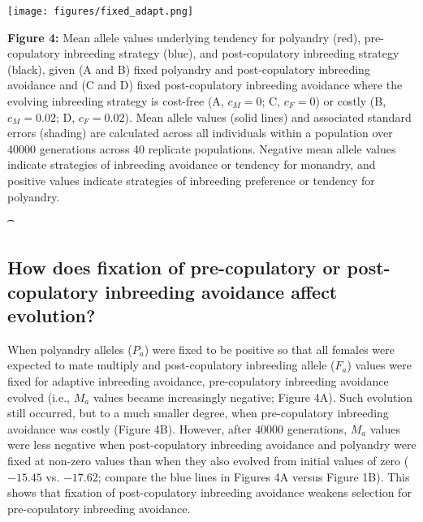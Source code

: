 \documentclass[10pt,letterpaper]{article}
\begin{document}
{\color{Gray}
\begin{adjustwidth}{-2.2in}{0in}
{%
   \texttt{[image: figures/fixed\_adapt.png]}%
}
{%
   \begin{justify}\vspace{0.25 mm} \textbf{Figure 4:} Mean allele values underlying tendency for polyandry (red), pre-copulatory inbreeding strategy (blue), and post-copulatory inbreeding strategy (black), given (A and B) fixed polyandry and post-copulatory inbreeding avoidance and (C and D) fixed post-copulatory inbreeding avoidance where the evolving inbreeding strategy is cost-free (A, $c_{M} = 0$; C, $c_{F} = 0$) or costly (B, $c_{M}=0.02$; D, $c_{F}=0.02$). Mean allele values (solid lines) and associated standard errors (shading) are calculated across all individuals within a population over 40000 generations across 40 replicate populations. Negative mean allele values indicate strategies of inbreeding avoidance or tendency for monandry, and positive values indicate strategies of inbreeding preference or tendency for polyandry. \end{justify}{\t}%
}
\end{adjustwidth}
}


\subsection*{How does fixation of pre-copulatory or post-copulatory inbreeding avoidance affect evolution?}

When polyandry alleles ($P_{a}$) were fixed to be positive so that all females were expected to mate multiply and post-copulatory inbreeding allele ($F_{a}$) values were fixed for adaptive inbreeding avoidance, pre-copulatory inbreeding avoidance evolved (i.e., $M_{a}$ values became increasingly negative; Figure 4A). Such evolution still occurred, but to a much smaller degree, when pre-copulatory inbreeding avoidance was costly (Figure 4B). However, after $40000$ generations, $M_{a}$ values were less negative when post-copulatory inbreeding avoidance and polyandry were fixed at non-zero values than when they also evolved from initial values of zero ($-15.45$ vs. $-17.62$; compare the blue lines in Figures 4A versus Figure 1B). This shows that fixation of post-copulatory inbreeding avoidance weakens selection for pre-copulatory inbreeding avoidance.
\end{document}
